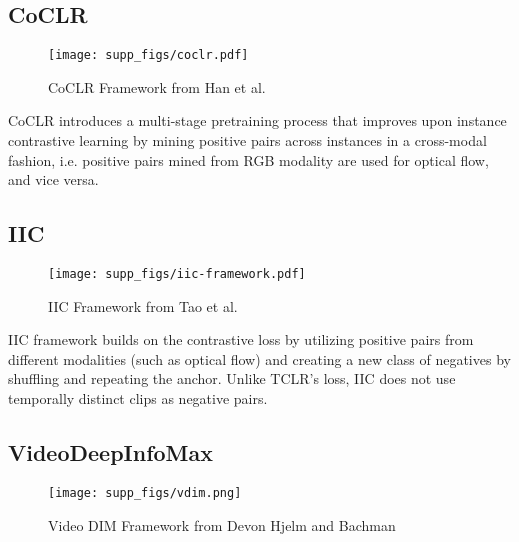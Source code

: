 \documentclass[10pt,twocolumn,letterpaper]{article}
\begin{document}
\subsection{CoCLR~\cite{cotraining}}

\begin{figure}[h]
\begin{center}
 \texttt{[image: supp\_figs/coclr.pdf]}
\end{center}
\vspace{-5mm}
   \caption{CoCLR Framework from Han et al.~\cite{cotraining}}
\label{fig:coclr}
\end{figure}
CoCLR introduces a multi-stage pretraining process that improves upon instance contrastive learning by mining positive pairs across instances in a cross-modal fashion, i.e. positive pairs mined from RGB modality are used for optical flow, and vice versa. 

\subsection{IIC~\cite{iic}}

\begin{figure}[h]
\begin{center}
 \texttt{[image: supp\_figs/iic-framework.pdf]}
\end{center}
\vspace{-5mm}
   \caption{IIC Framework from Tao et al.~\cite{iic}}
\label{fig:iic}
\end{figure}

IIC framework builds on the contrastive loss by utilizing positive pairs from different modalities (such as optical flow) and creating a new class of negatives by shuffling and repeating the anchor. Unlike TCLR's  loss, IIC does not use temporally distinct clips as negative pairs.





\subsection{VideoDeepInfoMax~\cite{vdim}}

\begin{figure}[h]
\begin{center}
 \texttt{[image: supp\_figs/vdim.png]}
\end{center}
\vspace{-5mm}
   \caption{Video DIM Framework from Devon Hjelm and Bachman~\cite{cotraining}}
\label{fig:vdim}
\end{figure}
\end{document}
